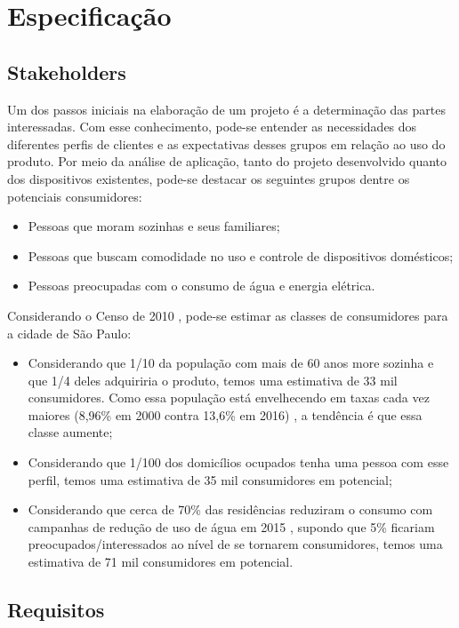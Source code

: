 \chapter{Especificação}

\section{Stakeholders}
Um dos passos iniciais na elaboração de um projeto é a determinação das partes interessadas. Com esse conhecimento, pode-se entender as necessidades dos diferentes perfis de clientes e as expectativas desses grupos em relação ao uso do produto. Por meio da análise de aplicação, tanto do projeto desenvolvido quanto dos dispositivos existentes, pode-se destacar os seguintes grupos dentre os potenciais consumidores:

\begin{itemize}
\item Pessoas que moram sozinhas e seus familiares;
\item Pessoas que buscam comodidade no uso e controle de dispositivos domésticos;
\item Pessoas preocupadas com o consumo de água e energia elétrica.
\end{itemize}

Considerando o Censo de 2010 \cite{ibge}, pode-se estimar as classes de consumidores para a cidade de São Paulo:

\begin{itemize}
\item Considerando que 1/10 da população com mais de 60 anos more sozinha e que 1/4 deles adquiriria o produto, temos uma estimativa de 33 mil consumidores. Como essa população está envelhecendo em taxas cada vez maiores (8,96\% em 2000 contra 13,6\% em 2016) \cite{bibliotecaVirtual}, a tendência é que essa classe aumente;
\item Considerando que 1/100 dos domicílios ocupados tenha uma pessoa com esse perfil, temos uma estimativa de 35 mil consumidores em potencial;
\item Considerando que cerca de 70\% das residências reduziram o consumo com campanhas de redução de uso de água em 2015 \cite{g1}, supondo que 5\% ficariam preocupados/interessados ao nível de se tornarem consumidores, temos uma estimativa de 71 mil consumidores em potencial.
\end{itemize}

\section{Requisitos}


